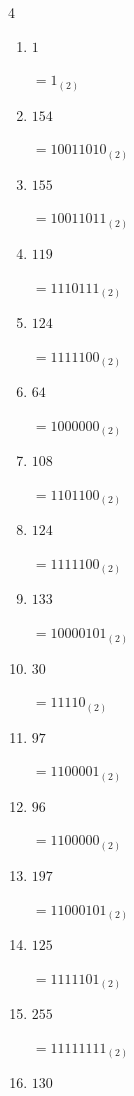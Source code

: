 \begin{multicols}{4}
\begin{enumerate}
        $=10111000_{(2)}$

  \item $1$

        $=1_{(2)}$

  \item $154$

        $=10011010_{(2)}$

  \item $155$

        $=10011011_{(2)}$

  \item $119$

        $=1110111_{(2)}$

  \item $124$

        $=1111100_{(2)}$

  \item $64$

        $=1000000_{(2)}$

  \item $108$

        $=1101100_{(2)}$

  \item $124$

        $=1111100_{(2)}$

  \item $133$

        $=10000101_{(2)}$

  \item $30$

        $=11110_{(2)}$

  \item $97$

        $=1100001_{(2)}$

  \item $96$

        $=1100000_{(2)}$

  \item $197$

        $=11000101_{(2)}$

  \item $125$

        $=1111101_{(2)}$

\columnbreak %

  \item $255$

        $=11111111_{(2)}$

  \item $130$


\end{enumerate}
\end{multicols}
